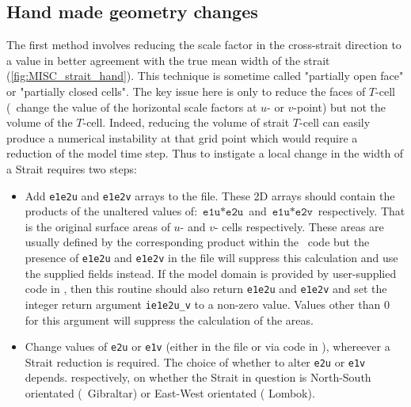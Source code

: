 \documentclass[../main/NEMO_manual]{subfiles}
\begin{document}
\subsection{Hand made geometry changes}
\label{subsec:MISC_strait_hand}

The first method involves reducing the scale factor in the cross-strait direction to a
value in better agreement with the true mean width of the strait
(\autoref{fig:MISC_strait_hand}).  This technique is sometime called "partially open face"
or "partially closed cells".  The key issue here is only to reduce the faces of $T$-cell
(\ie\ change the value of the horizontal scale factors at $u$- or $v$-point) but not the
volume of the $T$-cell.  Indeed, reducing the volume of strait $T$-cell can easily produce
a numerical instability at that grid point which would require a reduction of the model
time step.  Thus to instigate a local change in the width of a Strait requires two steps:

\begin{itemize}

\item Add \texttt{e1e2u} and \texttt{e1e2v} arrays to the  file. These 2D
arrays should contain the products of the unaltered values of: $\texttt{e1u}*\texttt{e2u}$
and $\texttt{e1u}*\texttt{e2v}$ respectively. That is the original surface areas of $u$-
and $v$- cells respectively.  These areas are usually defined by the corresponding product
within the \NEMO\ code but the presence of \texttt{e1e2u} and \texttt{e1e2v} in the
 file will suppress this calculation and use the supplied fields instead.
If the model domain is provided by user-supplied code in , then this
routine should also return \texttt{e1e2u} and \texttt{e1e2v} and set the integer return
argument \texttt{ie1e2u\_v} to a non-zero value. Values other than 0 for this argument
will suppress the calculation of the areas.

\item Change values of \texttt{e2u} or \texttt{e1v} (either in the  file or
via code in  ), whereever a Strait reduction is required. The choice of
whether to alter \texttt{e2u} or \texttt{e1v} depends. respectively,  on whether the
Strait in question is North-South orientated (\eg\ Gibraltar) or East-West orientated (\eg
Lombok).

\end{itemize}
\end{document}
